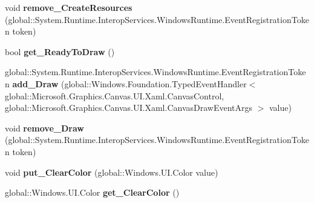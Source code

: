 \begin{DoxyCompactItemize}
\mbox{\label{interface_microsoft_1_1_graphics_1_1_canvas_1_1_u_i_1_1_xaml_1_1_i_canvas_control_a48c306eacb3c3028e82658d035cc92b5}} 
void {\bfseries remove\+\_\+\+Create\+Resources} (global\+::\+System.\+Runtime.\+Interop\+Services.\+Windows\+Runtime.\+Event\+Registration\+Token token)
\item 
\mbox{\label{interface_microsoft_1_1_graphics_1_1_canvas_1_1_u_i_1_1_xaml_1_1_i_canvas_control_af948766c9a45fe4b177283cc36deb1ad}} 
bool {\bfseries get\+\_\+\+Ready\+To\+Draw} ()
\item 
\mbox{\label{interface_microsoft_1_1_graphics_1_1_canvas_1_1_u_i_1_1_xaml_1_1_i_canvas_control_aab6814607ac46d5dfa2fdff6dbb0fa3c}} 
global\+::\+System.\+Runtime.\+Interop\+Services.\+Windows\+Runtime.\+Event\+Registration\+Token {\bfseries add\+\_\+\+Draw} (global\+::\+Windows.\+Foundation.\+Typed\+Event\+Handler$<$ global\+::\+Microsoft.\+Graphics.\+Canvas.\+U\+I.\+Xaml.\+Canvas\+Control, global\+::\+Microsoft.\+Graphics.\+Canvas.\+U\+I.\+Xaml.\+Canvas\+Draw\+Event\+Args $>$ value)
\item 
\mbox{\label{interface_microsoft_1_1_graphics_1_1_canvas_1_1_u_i_1_1_xaml_1_1_i_canvas_control_a7d03879a3626825631ff4dd027e13037}} 
void {\bfseries remove\+\_\+\+Draw} (global\+::\+System.\+Runtime.\+Interop\+Services.\+Windows\+Runtime.\+Event\+Registration\+Token token)
\item 
\mbox{\label{interface_microsoft_1_1_graphics_1_1_canvas_1_1_u_i_1_1_xaml_1_1_i_canvas_control_a9b6277e93cd22ec62980077d6054abfa}} 
void {\bfseries put\+\_\+\+Clear\+Color} (global\+::\+Windows.\+U\+I.\+Color value)
\item 
\mbox{\label{interface_microsoft_1_1_graphics_1_1_canvas_1_1_u_i_1_1_xaml_1_1_i_canvas_control_a07569bdb3de20d484ad960b033c65d6d}} 
global\+::\+Windows.\+U\+I.\+Color {\bfseries get\+\_\+\+Clear\+Color} ()

\end{DoxyCompactItemize}
